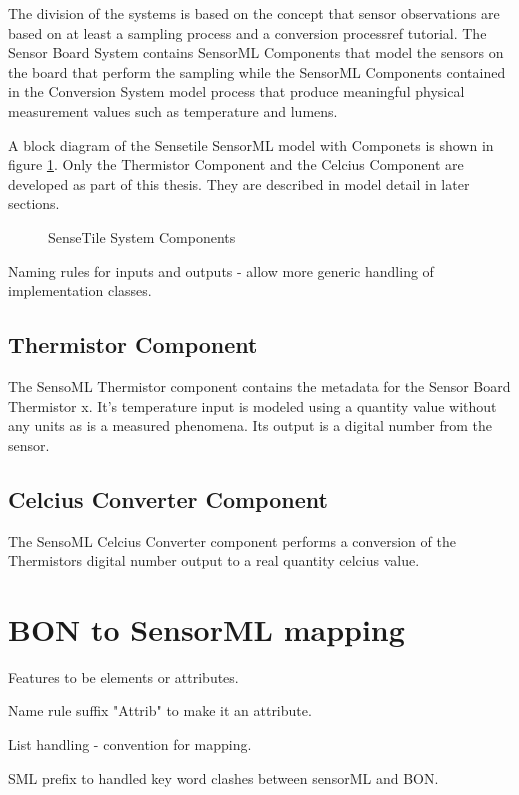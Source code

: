 \documentclass[]{final_report}
\begin{document}
The division of the systems is based on the concept that sensor observations are based on at least a sampling process and a conversion process{ref tutorial}. The Sensor Board System contains SensorML Components that model the sensors on the board that perform the sampling while the SensorML Components contained in the Conversion System model process that produce meaningful physical measurement values such as temperature and lumens.

A block diagram of the Sensetile SensorML model with Componets is shown in figure \ref{fig:SensorML_SenseTile_System_comp}. Only the Thermistor Component and the Celcius Component are developed as part of this thesis. They are described in model detail in later sections.
\begin{figure}[h]
\caption{SenseTile System Components}\label{fig:SensorML_SenseTile_System_comp}
\end{figure}

Naming rules for inputs and outputs - allow more generic handling of implementation classes.


\subsection{Thermistor Component}
The SensoML Thermistor component contains the metadata for the Sensor Board Thermistor x. It's temperature input is modeled using a quantity value without any units as is a measured phenomena. Its output is a digital number from the sensor.
\subsection{Celcius Converter Component}

The SensoML Celcius Converter component performs a conversion of the Thermistors digital number output to a real quantity celcius value. 


\newpage
\section{BON to SensorML mapping}
Features to be elements or attributes.

Name rule suffix "Attrib" to make it an attribute.

List handling - convention for mapping.

SML prefix to handled key word clashes between sensorML and BON.
\end{document}
